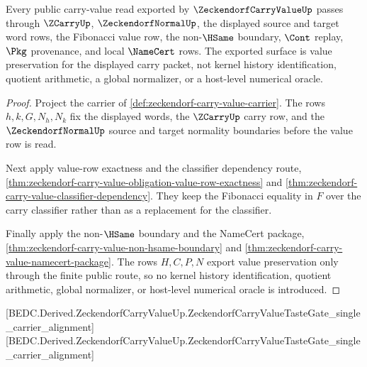 \begin{theorem}
\label{thm:zeckendorf-carry-value-scoped-public-route}
Every public carry-value read exported by $\ZeckendorfCarryValueUp$ passes through $\ZCarryUp$, $\ZeckendorfNormalUp$, the displayed source and target word rows, the Fibonacci value row, the non-$\HSame$ boundary, $\Cont$ replay, $\Pkg$ provenance, and local $\NameCert$ rows. The exported surface is value preservation for the displayed carry packet, not kernel history identification, quotient arithmetic, a global normalizer, or a host-level numerical oracle.
\end{theorem}
\begin{proof}
Project the carrier of \autoref{def:zeckendorf-carry-value-carrier}. The rows $h,k,G,N_h,N_k$ fix the displayed words, the $\ZCarryUp$ carry row, and the $\ZeckendorfNormalUp$ source and target normality boundaries before the value row is read.

Next apply value-row exactness and the classifier dependency route, \autoref{thm:zeckendorf-carry-value-obligation-value-row-exactness} and \autoref{thm:zeckendorf-carry-value-classifier-dependency}. They keep the Fibonacci equality in $F$ over the carry classifier rather than as a replacement for the classifier.

Finally apply the non-$\HSame$ boundary and the NameCert package, \autoref{thm:zeckendorf-carry-value-non-hsame-boundary} and \autoref{thm:zeckendorf-carry-value-namecert-package}. The rows $H,C,P,N$ export value preservation only through the finite public route, so no kernel history identification, quotient arithmetic, global normalizer, or host-level numerical oracle is introduced.
\end{proof}

[BEDC.Derived.ZeckendorfCarryValueUp.ZeckendorfCarryValueTasteGate\_single\_carrier\_alignment]
[BEDC.Derived.ZeckendorfCarryValueUp.ZeckendorfCarryValueTasteGate\_single\_carrier\_alignment]

